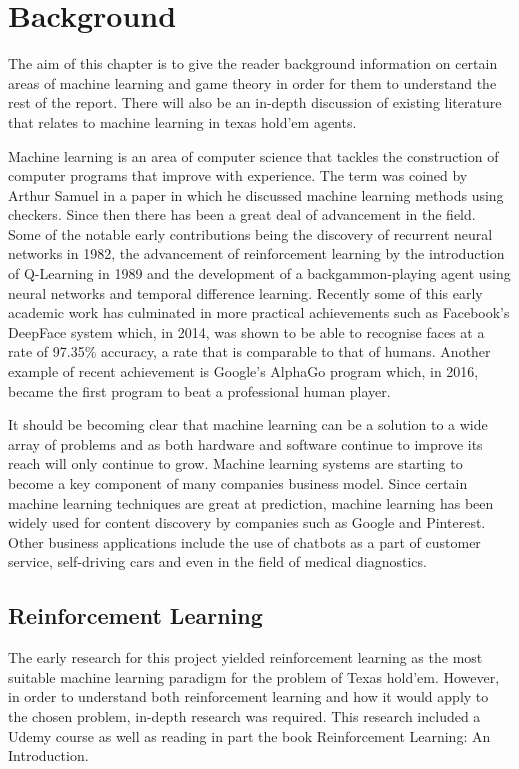 \chapter{Background}
\label{ch:background}

The aim of this chapter is to give the reader background information on certain areas of machine learning and
game theory in order for them to understand the rest of the report.
There will also be an in-depth discussion of existing literature that relates to machine learning in texas hold'em
agents.

Machine learning is an area of computer science that tackles the construction of computer programs that improve
with experience\citep{mitchell1997machine}.
The term was coined by Arthur Samuel in a paper in which he discussed machine learning methods using
checkers\citep{samuel1959some}.
Since then there has been a great deal of advancement in the field.
Some of the notable early contributions being the discovery of recurrent neural networks in 1982,
the advancement of reinforcement learning by the introduction of Q-Learning in 1989 and the
development of a backgammon-playing agent using neural networks and temporal difference learning\citep{tesauro1995td}.
Recently some of this early academic work has culminated in more practical achievements such as
Facebook's DeepFace system which, in 2014,  was shown to be able to recognise faces at a rate of 97.35\% accuracy,
a rate that is comparable to that of humans.
Another example of recent achievement is Google's AlphaGo program which, in 2016, became the first program to beat
a professional human player.

It should be becoming clear that machine learning can be a solution to a wide array of problems and as
both hardware and software continue to improve its reach will only continue to grow.
Machine learning systems are starting to become a key component of many companies business model.
Since certain machine learning techniques are great at prediction, machine learning has been widely used
for content discovery by companies such as Google and Pinterest.
Other business applications include the use of chatbots as a part of customer service, self-driving cars
and even in the field of medical diagnostics.


\section{Reinforcement Learning}\label{sec:reinforcementLearning}
The early research for this project yielded reinforcement learning as the most suitable machine learning
paradigm for the problem of Texas hold'em.
However, in order to understand both reinforcement learning and how it would apply to the chosen problem,
in-depth research was required.
This research included a Udemy course\citep{udemy2018rlpython} as well as reading in part the book
Reinforcement Learning: An Introduction\citep{sutton1998reinforcement}.

